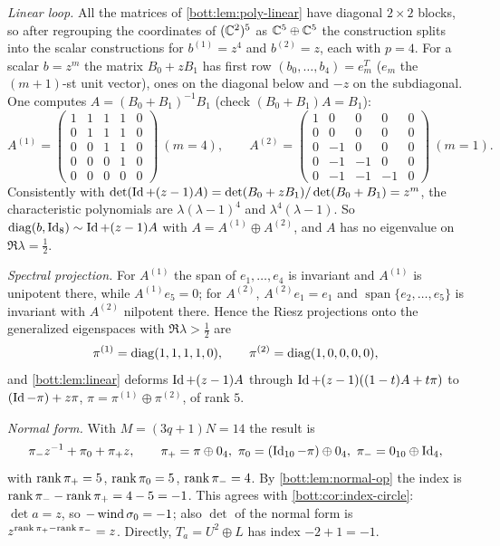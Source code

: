 \emph{Linear loop.} All the matrices of \cref{bott:lem:poly-linear} have diagonal $2\times2$
blocks, so after regrouping the coordinates of $(\mathbb{C}^2)^5$ as $\mathbb{C}^5\oplus\mathbb{C}^5$ the
construction splits into the scalar constructions for $b^{(1)}=z^4$ and $b^{(2)}=z$, each with
$p=4$. For a scalar $b=z^m$ the matrix $B_0+zB_1$ has first row $(b_0,\dots,b_4)=e_m^T$
($e_m$ the $(m+1)$-st unit vector), ones on the diagonal below and $-z$ on the subdiagonal.
One computes $A=(B_0+B_1)^{-1}B_1$ (check $(B_0+B_1)A=B_1$):
\begin{equation*}
  A^{(1)}=\begin{pmatrix}1&1&1&1&0\\0&1&1&1&0\\0&0&1&1&0\\0&0&0&1&0\\0&0&0&0&0\end{pmatrix}
  \ (m=4),\qquad
  A^{(2)}=\begin{pmatrix}1&0&0&0&0\\0&0&0&0&0\\0&-1&0&0&0\\0&-1&-1&0&0\\0&-1&-1&-1&0\end{pmatrix}
  \ (m=1).
\end{equation*}
Consistently with $\det(\operatorname{Id}+(z-1)A)=\det(B_0+zB_1)/\det(B_0+B_1)=z^m$, the characteristic
polynomials are $\lambda(\lambda-1)^4$ and $\lambda^4(\lambda-1)$. So
$\operatorname{diag}(b,\operatorname{Id}_8)\sim\operatorname{Id}+(z-1)A$ with $A=A^{(1)}\oplus A^{(2)}$, and $A$ has no eigenvalue on
$\Re\lambda=\frac12$.

\emph{Spectral projection.} For $A^{(1)}$ the span of $e_1,\dots,e_4$ is invariant and $A^{(1)}$
is unipotent there, while $A^{(1)}e_5=0$; for $A^{(2)}$, $A^{(2)}e_1=e_1$ and
$\operatorname{span}\{e_2,\dots,e_5\}$ is invariant with $A^{(2)}$ nilpotent there. Hence the
Riesz projections onto the generalized eigenspaces with $\Re\lambda>\frac12$ are
\begin{equation*}
  \pi^{(1)}=\operatorname{diag}(1,1,1,1,0),\qquad\pi^{(2)}=\operatorname{diag}(1,0,0,0,0),
\end{equation*}
and \cref{bott:lem:linear} deforms $\operatorname{Id}+(z-1)A$ through $\operatorname{Id}+(z-1)((1-t)A+t\pi)$ to
$(\operatorname{Id}-\pi)+z\pi$, $\pi=\pi^{(1)}\oplus\pi^{(2)}$, of rank $5$.

\emph{Normal form.} With $M=(3q+1)N=14$ the result is
\begin{equation*}
  \pi_-z^{-1}+\pi_0+\pi_+z,\qquad
  \pi_+=\pi\oplus0_4,\ \pi_0=(\Id_{10}-\pi)\oplus0_4,\ \pi_-=0_{10}\oplus\Id_4,
\end{equation*}
with $\operatorname{rank}\pi_+=5$, $\operatorname{rank}\pi_0=5$, $\operatorname{rank}\pi_-=4$. By \cref{bott:lem:normal-op} the index is
$\operatorname{rank}\pi_--\operatorname{rank}\pi_+=4-5=-1$. This agrees with \cref{bott:cor:index-circle}:
$\det a=z$, so $-\operatorname{wind}\sigma_0=-1$; also $\det$ of the normal form is
$z^{\operatorname{rank}\pi_+-\operatorname{rank}\pi_-}=z$. Directly, $T_a=U^2\oplus L$ has index $-2+1=-1$.

